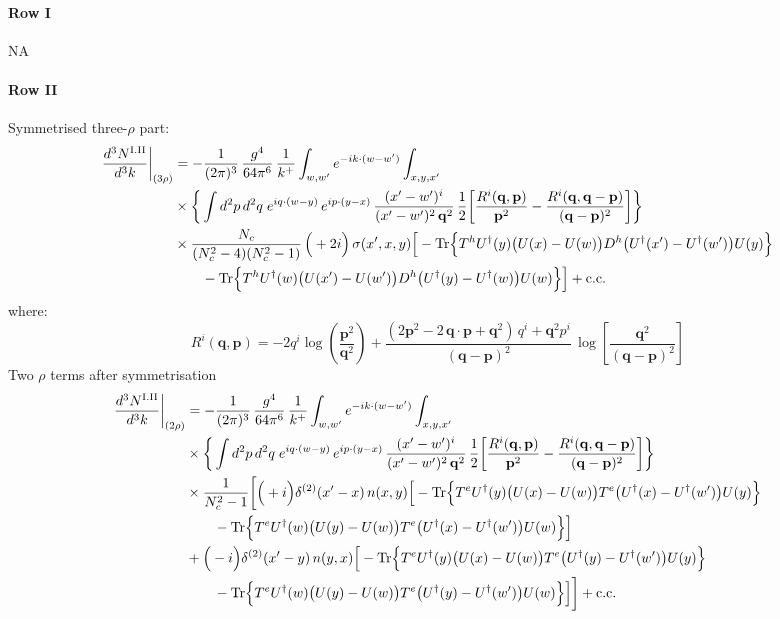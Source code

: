 \documentclass[9pt]{article}
\numberwithin{equation}{section}
\begin{document}
\paragraph*{Row I}
\textsc{NA}
\paragraph*{Row II}
Symmetrised three-$\rho$ part:
\begin{align}
\frac{d^{3}N^{\rm I.II}}{d^{3}k}\bigg|_{(3\rho)}&=-\frac{1}{(2\pi)^{3}}\,\frac{g^{4}}{64\pi^{6}}\,\frac{1}{k^{+}}\int_{w,w'}e^{-ik\cdot(w-w')}\int_{x,y,x'}\notag\\
&\times\bigg\{\int d^{2}p\,d^{2}q\;e^{iq\cdot(w-y)}\,e^{ip\cdot(y-x)}\,\frac{(x'-w')^{i}}{(x'-w')^{2}\,\mathbf{q}^{2}}\,\frac{1}{2}\bigg[\frac{R^{i}(\mathbf{q},\mathbf{p})}{\mathbf{p}^{2}}-\frac{R^{i}(\mathbf{q},\mathbf{q}-\mathbf{p})}{(\mathbf{q}-\mathbf{p})^{2}}\bigg]\bigg\}\notag\\
&\times \frac{N_{c}}{(N_{c}^{2}-4)(N_{c}^{2}-1)}\,\Big(+2i\Big)\,\sigma(x',x,y)\Big[-{\rm Tr}\Big\{T^{h}U^{\dagger}(y)\big(U(x)-U(w)\big)D^{h}\big(U^{\dagger}(x')-U^{\dagger}(w')\big)U(y)\Big\}\notag\\&\qquad-{\rm Tr}\Big\{T^{h}U^{\dagger}(w)\big(U(x')-U(w')\big)D^{h}\big(U^{\dagger}(y)-U^{\dagger}(w)\big)U(w)\Big\}\Big]+{\rm c.c.}\label{eq:S-I.II-3}
\end{align}
where: $$R^{i}(\mathbf{q},\mathbf{p})  = -2q^{i}\log\left(\frac{\mathbf{p}^{2}}{\mathbf{q}^{2}}\right)+\frac{(2\mathbf{p}^{2}-2\,\mathbf{q}\cdot\mathbf{p}+\mathbf{q}^{2})\,q^{i}+\mathbf{q}^{2}p^{i}}{(\mathbf{q}-\mathbf{p})^{2}}\,\log\left[\frac{\mathbf{q}^{2}}{(\mathbf{q}-\mathbf{p})^{2}}\right]$$
Two $\rho$ terms after symmetrisation
\begin{align}
\frac{d^{3}N^{\rm I.II}}{d^{3}k}\bigg|_{(2\rho)}&=-\frac{1}{(2\pi)^{3}}\,\frac{g^{4}}{64\pi^{6}}\,\frac{1}{k^{+}}\int_{w,w'}e^{-ik\cdot(w-w')}\int_{x,y,x'}\notag\\
&\times\bigg\{\int d^{2}p\,d^{2}q\;e^{iq\cdot(w-y)}\,e^{ip\cdot(y-x)}\,\frac{(x'-w')^{i}}{(x'-w')^{2}\,\mathbf{q}^{2}}\,\frac{1}{2}\bigg[\frac{R^{i}(\mathbf{q},\mathbf{p})}{\mathbf{p}^{2}}-\frac{R^{i}(\mathbf{q},\mathbf{q}-\mathbf{p})}{(\mathbf{q}-\mathbf{p})^{2}}\bigg]\bigg\}\notag\\
&\times \frac{1}{N_{c}^{2}-1}\bigg[\Big(+i\Big)\delta^{(2)}(x'-x)\,n(x,y)\Big[-{\rm Tr}\Big\{T^{e}U^{\dagger}(y)\big(U(x)-U(w)\big)T^{e}\big(U^{\dagger}(x)-U^{\dagger}(w')\big)U(y)\Big\}\notag\\&\qquad-{\rm Tr}\Big\{T^{e}U^{\dagger}(w)\big(U(y)-U(w)\big)T^{e}\big(U^{\dagger}(x)-U^{\dagger}(w')\big)U(w)\Big\}\Big]\notag\\
& +\Big(-i\Big)\delta^{(2)}(x'-y)\,n(y,x)\Big[-{\rm Tr}\Big\{T^{e}U^{\dagger}(y)\big(U(x)-U(w)\big)T^{e}\big(U^{\dagger}(y)-U^{\dagger}(w')\big)U(y)\Big\}\notag\\&\qquad-{\rm Tr}\Big\{T^{e}U^{\dagger}(w)\big(U(y)-U(w)\big)T^{e}\big(U^{\dagger}(y)-U^{\dagger}(w')\big)U(w)\Big\}\Big]\bigg]+{\rm c.c.}\label{eq:S-I.II-2}
\end{align}
\end{document}
